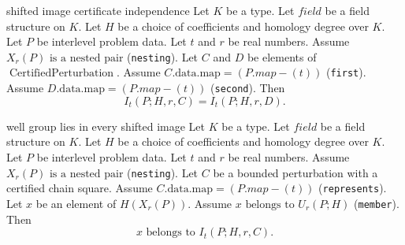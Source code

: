 \begin{cleanresult}{shifted image certificate independence}
Let $K$ be a type.
Let $\mathit{field}$ be a field structure on $K$.
Let $H$ be a choice of coefficients and homology degree over $K$.
Let $P$ be interlevel problem data.
Let $t$ and $r$ be real numbers.
Assume $X_{r}(P)\text{ is a nested pair}$ (\texttt{nesting}).
Let $C$ and $D$ be elements of $\operatorname{CertifiedPerturbation}$.
Assume $C.\mathrm{data}.\mathrm{map}=\left(P.map-\left(t\right)\right)$ (\texttt{first}).
Assume $D.\mathrm{data}.\mathrm{map}=\left(P.map-\left(t\right)\right)$ (\texttt{second}).
Then \[I_{t}(P;H,r,C)=I_{t}(P;H,r,D).\]
\end{cleanresult}

\begin{cleanresult}{well group lies in every shifted image}
Let $K$ be a type.
Let $\mathit{field}$ be a field structure on $K$.
Let $H$ be a choice of coefficients and homology degree over $K$.
Let $P$ be interlevel problem data.
Let $t$ and $r$ be real numbers.
Assume $X_{r}(P)\text{ is a nested pair}$ (\texttt{nesting}).
Let $C$ be a bounded perturbation with a certified chain square.
Assume $C.\mathrm{data}.\mathrm{map}=\left(P.map-\left(t\right)\right)$ (\texttt{represents}).
Let $x$ be an element of $H(X_{r}(P))$.
Assume $x\text{ belongs to }U_{r}(P;H)$ (\texttt{member}).
Then \[x\text{ belongs to }I_{t}(P;H,r,C).\]
\par{}
\end{cleanresult}

